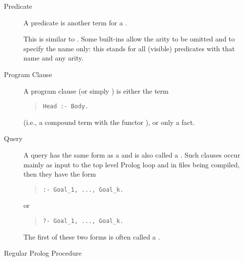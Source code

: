 \begin{description}
%
\item[Predicate]
A predicate is another term for a .

\item[]
This is similar to .
Some built-ins allow the arity to be omitted and to specify the name only:
this stands for all (visible) predicates with that name and any arity.

\item[Program Clause]
A program clause (or simply ) is either the term
\begin{quote}
\begin{verbatim}
Head :- Body.
\end{verbatim}
\end{quote}
(i.e., a compound term with the functor ), or only a fact.

\item[Query]
A query  has the same form as a  and is also called a .
Such clauses occur mainly as input to the top level Prolog loop
and in files being compiled, then they have the form
\begin{quote}
\begin{verbatim}
:- Goal_1, ..., Goal_k.
\end{verbatim}
\end{quote}
or
\begin{quote}
\begin{verbatim}
?- Goal_1, ..., Goal_k.
\end{verbatim}
\end{quote}
The first of these two forms is often called a .

\item[Regular Prolog Procedure%
]


\end{description}

